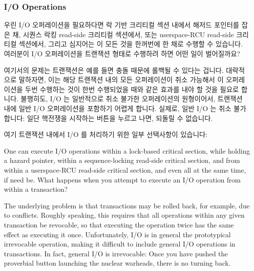 \subsubsection{I/O Operations}
\label{sec:future:I/O Operations}

우린 I/O 오퍼레이션을 필요하다면 락 기반 크리티컬 섹션 내에서 해저드 포인터를
잡은 채, 시퀀스 락킹 read-side 크리티컬 섹션에서, 또는 userspace-RCU read-side
크리티컬 섹션에서, 그리고 심지어는 이 모든 것을 한꺼번에 한 채로 수행할 수
있습니다.
여러분이 I/O 오퍼레이션을 트랜잭션 형태로 수행하려 하면 어떤 일이 벌어질까요?

여기서의 문제는 트랜잭션은 예를 들면 충돌 때문에 롤백될 수 있다는 겁니다.
대략적으로 말하자면, 이는 해당 트랜잭션 내의 모든 오퍼레이션이 취소 가능해서 이
오퍼레이션을 두번 수행하는 것이 한번 수행되었을 때와 같은 효과를 내야 할 것을
필요로 합니다.
불행히도, I/O 는 일반적으로 취소 불가한 오퍼레이션의 원형이어서, 트랜잭션 내에
일반 I/O 오퍼레이션을 포함하기 어렵게 합니다.
실제로, 일반 I/O 는 취소 불가합니다:
일단 핵전쟁을 시작하는 버튼을 누르고 나면, 되돌릴 수 없습니다.

여기 트랜잭션 내에서 I/O 를 처리하기 위한 일부 선택사항이 있습니다:

\iffalse

One can execute I/O operations within a lock-based critical section,
while holding a hazard pointer, within a sequence-locking read-side
critical section, and from within a userspace-RCU read-side critical
section, and even all at the same time, if need be.
What happens when you attempt to execute an I/O operation from within
a transaction?

The underlying problem is that transactions may be rolled back, for
example, due to conflicts.
Roughly speaking, this requires that all operations within any given
transaction be revocable, so that executing the operation twice has
the same effect as executing it once.
Unfortunately, I/O is in general the prototypical irrevocable
operation, making it difficult to include general I/O operations in
transactions.
In fact, general I/O is irrevocable:
Once you have pushed the proverbial button launching the nuclear warheads,
there is no turning back.

